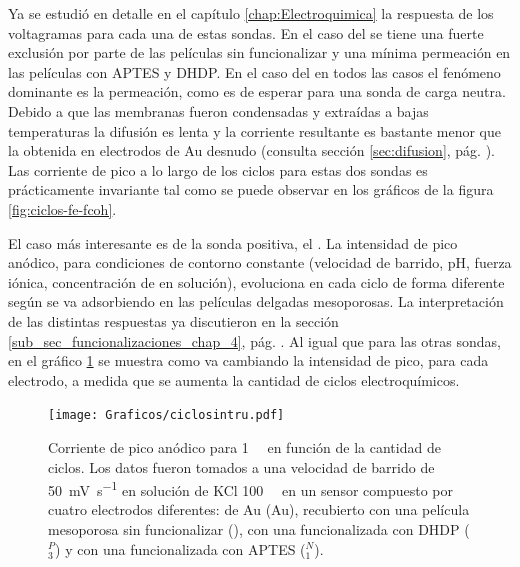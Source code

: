 {	Ya se estudió en detalle en el capítulo \ref{chap:Electroquimica} la respuesta de los voltagramas para cada una de estas sondas. En el caso del \fe\space se tiene una fuerte exclusión por parte de las películas sin funcionalizar y una mínima permeación en las películas con APTES y DHDP. 
	En el caso del \fc\space en todos las casos el fenómeno dominante es la permeación, como es de esperar para una sonda de carga neutra. Debido a que las membranas fueron condensadas y extraídas a bajas temperaturas la difusión es lenta y la corriente resultante es bastante menor que la obtenida en electrodos de Au desnudo (consulta sección \ref{sec:difusion}, pág. \pageref{sec:difusion}). Las corriente de pico a lo largo de los ciclos para estas dos sondas es prácticamente invariante tal como se puede observar en los gráficos de la figura \ref{fig:ciclos-fe-fcoh}.

	El caso más interesante es de la sonda positiva, el \ru. La intensidad de pico anódico, para condiciones de contorno constante (velocidad de barrido, pH, fuerza iónica, concentración de \ru\space en solución), evoluciona en cada ciclo de forma diferente según se va adsorbiendo en las películas delgadas mesoporosas. La interpretación de las distintas respuestas ya discutieron en la sección \ref{sub_sec_funcionalizaciones_chap_4}, pág. \pageref{sub_sec_funcionalizaciones_chap_4}. Al igual que para las otras sondas, en el gráfico \ref{fig:ruciclos}  se muestra como va cambiando la intensidad de pico, para cada electrodo, a medida que se aumenta la cantidad de ciclos electroquímicos. 

			\begin{figure}[ht!]
		 	       	\begin{center}
		 	       	\texttt{[image: Graficos/ciclosintru.pdf]}
		        	\caption[Corriente de pico de \ru\space en función del número de ciclos]{Corriente de pico anódico para \ru\space \SI{1}{\milli\Molar} en función de la cantidad de ciclos. Los datos fueron tomados a una velocidad de barrido de \SI{50}{\milli\volt\per\second} en solución de KCl \SI{100}{\milli\Molar} en un sensor compuesto por cuatro electrodos diferentes: de Au (Au), recubierto con una película mesoporosa sin funcionalizar (\pdmZ), con una funcionalizada con DHDP (\pdmZ$^P_3$) y con una funcionalizada con APTES (\pdmZ$^N_1$).}
		         	\label{fig:ruciclos}
		         	\end{center}
		     		\end{figure}
	
}
